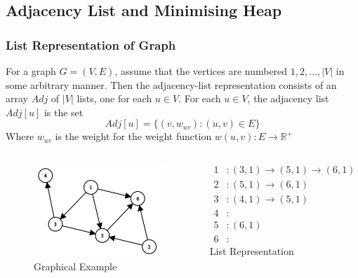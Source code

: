 \documentclass{beamer}
\begin{document}
\subsection{Adjacency List and Minimising Heap}
\begin{frame}
	\frametitle{List Representation of Graph}	
	For a graph \( G = (V, E) \), assume that the vertices are numbered \( 1, 2, \hdots, \lvert{ V }\rvert  \) in some arbitrary manner. Then the adjacency-list representation consists of an array \( Adj \) of \( \lvert{ V }\rvert  \) lists, one for each \( u \in V \). For each \( u \in V\), the adjacency list \( Adj[u] \) is the set
	\[
		Adj[u] = \{ (v, w_{uv}) : (u, v) \in E\}
	\]
	Where \( w_{uv} \) is the weight for the weight function \( w(u, v) : E \rightarrow \mathbb{R}^+ \) 
\end{frame}

\begin{frame}
	\begin{columns}
	\begin{figure}
		\includegraphics[scale=0.5]{./pict/exampleGraph.png}
		\caption{Graphical Example}
	\end{figure}

	\begin{align*}
		1 &: (3, 1) \rightarrow (5, 1) \rightarrow (6, 1)\\
		2 &: (5, 1) \rightarrow (6, 1) \\
		3 &: (4, 1) \rightarrow (5, 1) \\
		4 &: \\
		5 &: (6, 1)\\
		6 &: 
	\end{align*}			
	\centering List Representation
			
	\end{columns}
\end{frame}
\end{document}
